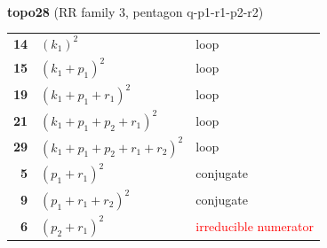 \documentclass[10pt]{article}
\begin{document}
\begin{minipage}[t]{0.48\textwidth}
{}\\[2mm]\textbf{topo28} (RR family 3, pentagon q-p1-r1-p2-r2)\\[2pt]{\footnotesize\begin{tabular}{@{}r@{\ \ }l@{\ \ }l@{}}\textbf{14} & $(k_1)^2$ & loop\\
\textbf{15} & $(k_1+p_1)^2$ & loop\\
\textbf{19} & $(k_1+p_1+r_1)^2$ & loop\\
\textbf{21} & $(k_1+p_1+p_2+r_1)^2$ & loop\\
\textbf{29} & $(k_1+p_1+p_2+r_1+r_2)^2$ & loop\\
\textbf{5} & $(p_1+r_1)^2$ & conjugate\\
\textbf{9} & $(p_1+r_1+r_2)^2$ & conjugate\\
\textbf{6} & $(p_2+r_1)^2$ & \textcolor{red}{irreducible numerator}\\\end{tabular}}\end{minipage}

\bigskip
\end{document}
